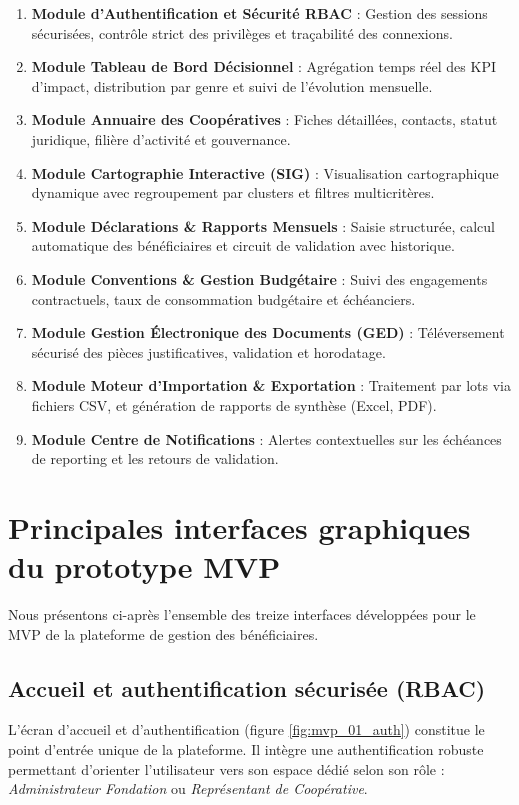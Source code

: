 \begin{enumerate}
    \item \textbf{Module d'Authentification et Sécurité RBAC} : Gestion des sessions sécurisées, contrôle strict des privilèges et traçabilité des connexions.
    \item \textbf{Module Tableau de Bord Décisionnel} : Agrégation temps réel des KPI d'impact, distribution par genre et suivi de l'évolution mensuelle.
    \item \textbf{Module Annuaire des Coopératives} : Fiches détaillées, contacts, statut juridique, filière d'activité et gouvernance.
    \item \textbf{Module Cartographie Interactive (SIG)} : Visualisation cartographique dynamique avec regroupement par clusters et filtres multicritères.
    \item \textbf{Module Déclarations \& Rapports Mensuels} : Saisie structurée, calcul automatique des bénéficiaires et circuit de validation avec historique.
    \item \textbf{Module Conventions \& Gestion Budgétaire} : Suivi des engagements contractuels, taux de consommation budgétaire et échéanciers.
    \item \textbf{Module Gestion Électronique des Documents (GED)} : Téléversement sécurisé des pièces justificatives, validation et horodatage.
    \item \textbf{Module Moteur d'Importation \& Exportation} : Traitement par lots via fichiers CSV, et génération de rapports de synthèse (Excel, PDF).
    \item \textbf{Module Centre de Notifications} : Alertes contextuelles sur les échéances de reporting et les retours de validation.
\end{enumerate}

\section{Principales interfaces graphiques du prototype MVP}

Nous présentons ci-après l'ensemble des treize interfaces développées pour le MVP de la plateforme de gestion des bénéficiaires.

\subsection{Accueil et authentification sécurisée (RBAC)}

L'écran d'accueil et d'authentification (figure \ref{fig:mvp_01_auth}) constitue le point d'entrée unique de la plateforme. Il intègre une authentification robuste permettant d'orienter l'utilisateur vers son espace dédié selon son rôle : \textit{Administrateur Fondation} ou \textit{Représentant de Coopérative}.

